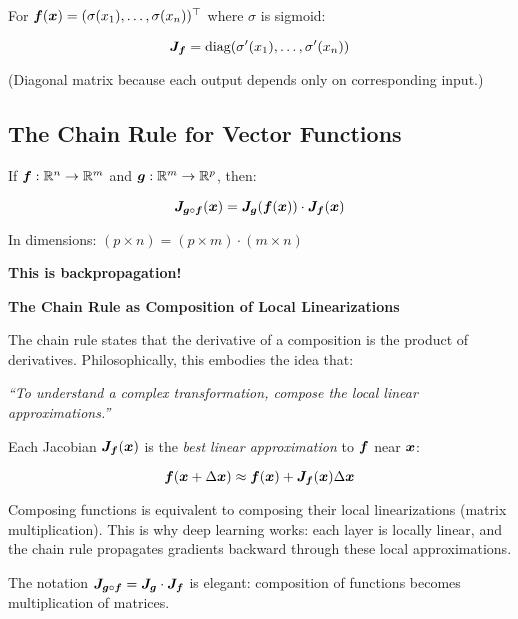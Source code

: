 \begin{example}
For $\bm{f}(\bm{x}) = (\sigma(x_1), \ldots, \sigma(x_n))^\top$ where $\sigma$ is sigmoid:

\begin{equation}
    \bm{J}_{\bm{f}} = \text{diag}(\sigma'(x_1), \ldots, \sigma'(x_n))
\end{equation}

(Diagonal matrix because each output depends only on corresponding input.)
\end{example}

\subsection{The Chain Rule for Vector Functions}

\begin{theorem}
If $\bm{f}: \mathbb{R}^n \to \mathbb{R}^m$ and $\bm{g}: \mathbb{R}^m \to \mathbb{R}^p$, then:

\begin{equation}
    \bm{J}_{\bm{g} \circ \bm{f}}(\bm{x}) = \bm{J}_{\bm{g}}(\bm{f}(\bm{x})) \cdot \bm{J}_{\bm{f}}(\bm{x})
\end{equation}

In dimensions: $(p \times n) = (p \times m) \cdot (m \times n)$

\textbf{This is backpropagation!}
\end{theorem}

\begin{philobox}
\textbf{The Chain Rule as Composition of Local Linearizations}

The chain rule states that the derivative of a composition is the product of derivatives. Philosophically, this embodies the idea that:

\begin{center}
\itshape
``To understand a complex transformation, compose the local linear approximations.''
\end{center}

Each Jacobian $\bm{J}_{\bm{f}}(\bm{x})$ is the \textit{best linear approximation} to $\bm{f}$ near $\bm{x}$:

\begin{equation}
    \bm{f}(\bm{x} + \Delta \bm{x}) \approx \bm{f}(\bm{x}) + \bm{J}_{\bm{f}}(\bm{x}) \Delta \bm{x}
\end{equation}

Composing functions is equivalent to composing their local linearizations (matrix multiplication). This is why deep learning works: each layer is locally linear, and the chain rule propagates gradients backward through these local approximations.

The notation $\bm{J}_{\bm{g} \circ \bm{f}} = \bm{J}_{\bm{g}} \cdot \bm{J}_{\bm{f}}$ is elegant: composition of functions becomes multiplication of matrices.
\end{philobox}

